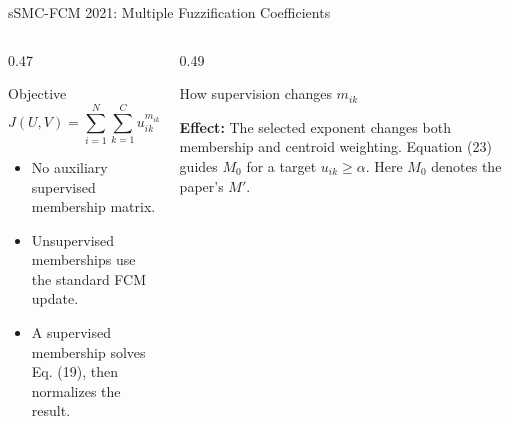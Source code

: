 \documentclass[t,aspectratio=169]{beamer}
\begin{document}
\begin{frame}{sSMC-FCM 2021: Multiple Fuzzification Coefficients}
  \small
  \begin{columns}[T,onlytextwidth]
    \begin{column}{0.47\textwidth}
      \begin{block}{Objective}
        \[
          J(U,V)=\sum_{i=1}^{N}\sum_{k=1}^{C}
          u_{ik}^{m_{ik}}D_{ik}^{2}
        \]
      \end{block}

      \begin{itemize}
        \item No auxiliary supervised membership matrix.
        \item Unsupervised memberships use the standard FCM update.
        \item A supervised membership solves Eq. (19), then normalizes the result.
      \end{itemize}
    \end{column}
    \begin{column}{0.49\textwidth}
      \begin{block}{How supervision changes $m_{ik}$}
        \centering
      \end{block}

      \vspace{0.25em}
      \textbf{Effect:} The selected exponent changes both membership and centroid weighting. Equation (23) guides $M_0$ for a target $u_{ik}\geq\alpha$. Here $M_0$ denotes the paper's $M'$.
    \end{column}
  \end{columns}
\end{frame}
\end{document}
